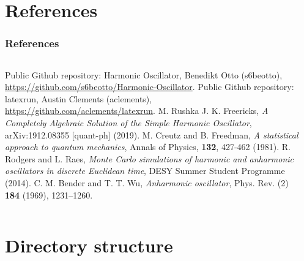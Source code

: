 \documentclass[aspectratio=169]{beamer}
\begin{document}
\section{References}
\begin{frame}
\frametitle{References}
\vspace{-20px}
\begin{columns}[T]
	\begin{column}{0.49\textwidth}
		\begin{tiny}
			\begin{thebibliography}{99}
				\fontsize{6}{6}
				 Public Github repository: Harmonic Oscillator, Benedikt Otto (s6beotto), \\\url{https://github.com/s6beotto/Harmonic-Oscillator}.
				 Public Github repository: latexrun, Austin Clements (aclements), \\\url{https://github.com/aclements/latexrun}.
				 M. Rushka J. K. Freericks, \textit{A Completely Algebraic Solution of the Simple Harmonic Oscillator}, arXiv:1912.08355 [quant-ph] (2019).
				 M. Creutz and B. Freedman, \textit{A statistical approach to quantum mechanics}, Annals of Physics, \textbf{132}, 427-462 (1981).
				 R. Rodgers and L. Raes, \textit{Monte Carlo simulations of harmonic and anharmonic oscillators in discrete Euclidean time}, DESY Summer Student Programme (2014).
				 C. M. Bender and T. T. Wu, \textit{Anharmonic oscillator}, Phys. Rev. (2) \textbf{184} (1969), 1231–1260.
				\setcounter{firstbib}{\value{enumiv}}
			\end{thebibliography}
		\end{tiny}
	\end{column}
	\begin{column}{0.49\textwidth}
		\begin{tiny}
			\begin{thebibliography}{99}
				\fontsize{6}{6}
				\setcounter{enumiv}{\value{firstbib}}
			\end{thebibliography}
		\end{tiny}
	\end{column}
\end{columns}
\end{frame}


\appendixstyle

\appendix

\section{Directory structure}
\end{document}
